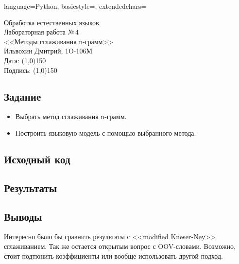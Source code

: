 \documentclass[12pt]{article}
\newcommand{\StudentName}{Ильвохин Дмитрий}
\newcommand{\Group}{1O-106М}
\newcommand{\CourseName}{Обработка естественных языков}
\newcommand{\LabNum}{4}
\newcommand{\Subject}{Методы сглаживания n-грамм}
\begin{document}
\lstset
{
        language=Python,
        basicstyle=\footnotesize,%
        extendedchars=\true
}

\begin{flushright}
\Large{
	\CourseName \\
	Лабораторная работа №\,\LabNum \\
	<<\Subject>> \\
  \StudentName, \Group \\
  Дата: \line(1,0){150} \\
  Подпись: \line(1,0){150} \\
}
\end{flushright}

\subsection*{Задание}
  \begin{itemize}
    \item Выбрать метод сглаживания n-грамм.
    \item Построить языковую модель с помощью выбранного метода.
  \end{itemize}

\subsection*{Исходный код}


\subsection*{Результаты}


\subsection*{Выводы}
Интересно было бы сравнить результаты с <<modified Kneser-Ney>> сглаживанием.
Так же остается открытым вопрос с OOV-словами. Возможно, стоит подтюнить
коэффициенты или вообще использовать другой подход.
\end{document}
